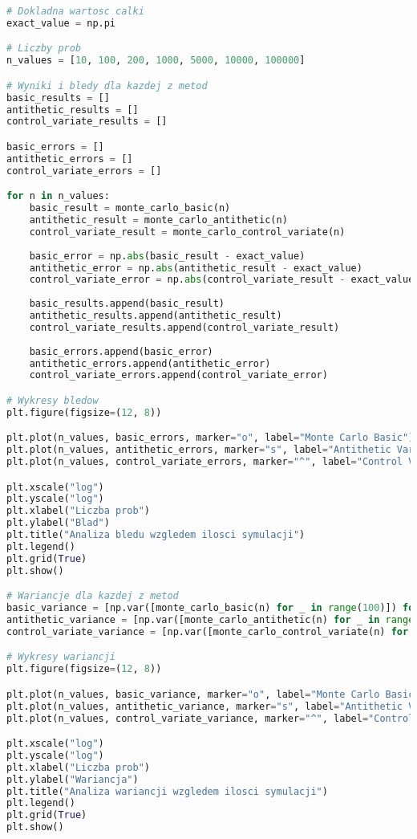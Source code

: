 \documentclass[12pt,letterpaper]{article}
\theoremstyle{definition}
\begin{document}
\begin{lstlisting}[language=Python, caption=Skrypt do Zad 3.]
# Dokladna wartosc calki
exact_value = np.pi

# Liczby prob
n_values = [10, 100, 200, 1000, 5000, 10000, 100000]

# Wyniki i bledy dla kazdej z metod
basic_results = []
antithetic_results = []
control_variate_results = []

basic_errors = []
antithetic_errors = []
control_variate_errors = []

for n in n_values:
    basic_result = monte_carlo_basic(n)
    antithetic_result = monte_carlo_antithetic(n)
    control_variate_result = monte_carlo_control_variate(n)
    
    basic_error = np.abs(basic_result - exact_value)
    antithetic_error = np.abs(antithetic_result - exact_value)
    control_variate_error = np.abs(control_variate_result - exact_value)
    
    basic_results.append(basic_result)
    antithetic_results.append(antithetic_result)
    control_variate_results.append(control_variate_result)
    
    basic_errors.append(basic_error)
    antithetic_errors.append(antithetic_error)
    control_variate_errors.append(control_variate_error)

# Wykresy bledow
plt.figure(figsize=(12, 8))

plt.plot(n_values, basic_errors, marker="o", label="Monte Carlo Basic")
plt.plot(n_values, antithetic_errors, marker="s", label="Antithetic Variates")
plt.plot(n_values, control_variate_errors, marker="^", label="Control Variates")

plt.xscale("log")
plt.yscale("log")
plt.xlabel("Liczba prob")
plt.ylabel("Blad")
plt.title("Analiza bledu wzgledem ilosci symulacji")
plt.legend()
plt.grid(True)
plt.show()

# Wariancje dla kazdej z metod
basic_variance = [np.var([monte_carlo_basic(n) for _ in range(100)]) for n in n_values]
antithetic_variance = [np.var([monte_carlo_antithetic(n) for _ in range(100)]) for n in n_values]
control_variate_variance = [np.var([monte_carlo_control_variate(n) for _ in range(100)]) for n in n_values]

# Wykresy wariancji
plt.figure(figsize=(12, 8))

plt.plot(n_values, basic_variance, marker="o", label="Monte Carlo Basic")
plt.plot(n_values, antithetic_variance, marker="s", label="Antithetic Variates")
plt.plot(n_values, control_variate_variance, marker="^", label="Control Variates")

plt.xscale("log")
plt.yscale("log")
plt.xlabel("Liczba prob")
plt.ylabel("Wariancja")
plt.title("Analiza wariancji wzgledem ilosci symulacji")
plt.legend()
plt.grid(True)
plt.show()


\end{lstlisting}
\end{document}

